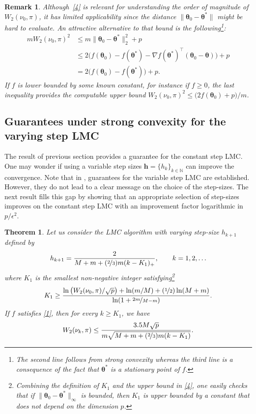\documentclass[aoap,preprint,reqno,a4paper]{imsart} %
\newcommand{\NN}{\mathbb{N}}
\newcommand{\btheta}{\boldsymbol{\theta}}
\newcommand{\bh}{\boldsymbol h}
\newtheorem{remark}{Remark}[section]
\newtheorem{theorem}{Theorem}
\begin{document}
\begin{remark}
Although~\eqref{4} is relevant for understanding the order of magnitude of
$W_2(\nu_0,\pi)$, it has limited applicability since the distance
$\|\btheta_0-\btheta^*\|$ might be hard to evaluate. An attractive
alternative to that bound is the following\footnote{The second line follows from
strong convexity whereas the third line is a consequence of the fact that $\btheta^*$
is a stationary point of $f$.}:
\begin{align}
m W_2(\nu_0,\pi)^2
	& \le  m\|\btheta_{0}-\btheta^*\|_2^2 + p\\
	& \le 2\big(f(\btheta_0)-f(\btheta^*)-\nabla f(\btheta^*)^\top(\btheta_0-\btheta)
	\big)+ p\\
	& = 2\big(f(\btheta_0)-f(\btheta^*)\big)+p.\label{init1}
\end{align}
If $f$ is lower bounded by some known constant, for instance if $f\ge 0$,
the last inequality provides the computable upper bound $W_2(\nu_0,\pi)^2 \le
\big(2f(\btheta_0)+p\big)/m$.
\end{remark}

\subsection{Guarantees under strong convexity for the varying step LMC}

The result of previous section provides a guarantee for the constant step LMC. One may wonder
if using a variable step sizes $\bh = \{h_k\}_{k\in\NN}$ can improve the convergence. Note that
in \citep[Theorem 5]{Durmus2}, guarantees for the variable step LMC are established. However,
they do not lead to a clear message on the choice of the step-sizes. The next result fills this gap
by showing that an appropriate selection of step-sizes improves on the constant step LMC with  an
improvement factor logarithmic in $p/\epsilon^2$.


\begin{theorem}\label{thOneBis}
Let us consider the LMC algorithm with varying step-size $h_{k+1}$ defined
by
\begin{equation}\label{h2}
h_{k+1}  = \frac{2}{M+m+(\nicefrac23)m(k-K_1)_+},\qquad k=1,2,\ldots
\end{equation}
where $K_1$ is the smallest non-negative integer
satisfying\footnote{Combining the definition of $K_1$ and the upper bound in \eqref{4},
one easily checks that if $\|\btheta_0-\btheta^*\|_\infty$ is bounded, then $K_1$ is
upper bounded by a constant that does not depend on the dimension $p$.}
\begin{equation}\label{K1}
K_1\ge \frac{\ln \big(W_2(\nu_0,\pi)/\sqrt{p}\big) + \ln(m/M) + (\nicefrac12)\ln(M+m)}{\ln(1+\nicefrac{2m}{M-m})}.
\end{equation}
If $f$ satisfies \eqref{1}, then for every $k\ge K_1$, we have
\begin{equation}\label{W2}
W_2(\nu_k,\pi)\le \frac{3.5M\sqrt{p}}{m\sqrt{M+m+(\nicefrac23)m(k-K_1)}}.
\end{equation}
\end{theorem}
\end{document}

